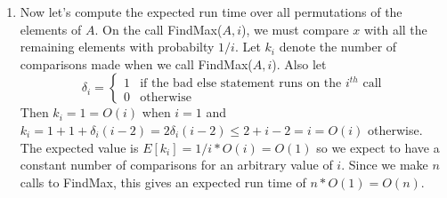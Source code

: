 \documentclass[11pt]{article}
\begin{document}
\begin{enumerate}
\item Now let's compute the expected run time over all permutations of the elements of $A$.
On the call FindMax($A, i$), we must compare $x$ with all the remaining elements with probabilty $1/i$.
Let $k_i$ denote the number of comparisons made when we call FindMax($A, i$).
Also let
\[ \delta _i =
\begin{cases}
    1 & \text{if the bad else statement runs on the $i^{th}$ call} \\
    0 & \text{otherwise}
\end{cases}
\]
Then $k_i = 1 = O(i)$ when $i = 1$ and $k_i = 1 + 1 + \delta_i (i - 2) = 2 \delta _i (i-2) \leq 2 + i - 2 = i = O(i)$ otherwise.
The expected value is $E[k_i] = 1/i * O(i) = O(1)$ so we expect to have a constant number of comparisons for an arbitrary value of $i$.
Since we make $n$ calls to FindMax, this gives an expected run time of $n * O(1) = O(n)$.

\end{enumerate}
\end{document}
